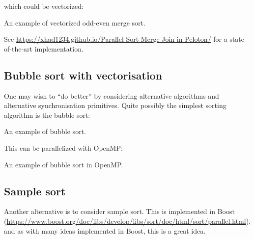 which could be vectorized:

\begin{codebox}[breakable]{}
    \footnotesize An example of vectorized odd-even merge sort.
    \tcblower
    \end{codebox}

See \url{https://xhad1234.github.io/Parallel-Sort-Merge-Join-in-Peloton/} for a state-of-the-art implementation. 

\subsection{Bubble sort with vectorisation}

One may wish to ``do better'' by considering alternative algorithms and alternative synchronisation primitives. Quite possibly the simplest sorting algorithm is the bubble sort: 

\begin{codebox}[breakable]{}
\footnotesize An example of bubble sort.
\tcblower
{}
\end{codebox}

This can be parallelized with OpenMP:

\begin{codebox}[breakable]{}
\footnotesize An example of bubble sort in OpenMP.
\tcblower
{}
\end{codebox}

\subsection{Sample sort}
 

Another alternative is to consider sample sort. This is implemented in Boost 
(\url{https://www.boost.org/doc/libs/develop/libs/sort/doc/html/sort/parallel.html}), 
and as with many ideas implemented in Boost, this is a great idea. 


